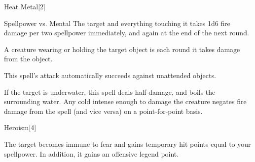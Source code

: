 \begin{spellsection}{Heat Metal}[2]
    \begin{spellheader}
    \end{spellheader}
    \begin{spellcontent}
        \begin{spelltargetinginfo}
        \end{spelltargetinginfo}
        \begin{spelleffects}
            \begin{spellattack}{Spellpower vs. Mental}
                \spellsuccess The target and everything touching it takes 1d6 fire damage per two spellpower immediately, and again at the end of the next round.

                A creature wearing or holding the target object is \dazed each round it takes damage from the object.
            \end{spellattack}
        \end{spelleffects}
    \end{spellcontent}
    \begin{spellfooter}
        \spellnotes This spell's attack automatically succeeds against unattended objects.

        If the target is underwater, this spell deals half damage, and boils the surrounding water. Any cold intense enough to damage the creature negates fire damage from the spell (and vice versa) on a point-for-point basis.
        \miscastrandom
    \end{spellfooter}
\end{spellsection}

\begin{spellsection}{Heroism}[4]
    \begin{spellheader}
    \end{spellheader}
    \begin{spellcontent}
        \begin{spelltargetinginfo}
        \end{spelltargetinginfo}
        \begin{spelleffects}
            \spelleffect The target becomes immune to fear and gains temporary hit points equal to your spellpower. In addition, it gains an offensive legend point.
            \spelldur \durshort \dismissable
        \end{spelleffects}
    \end{spellcontent}
    \begin{spellfooter}
        \miscastrandom
    \end{spellfooter}
\end{spellsection}


